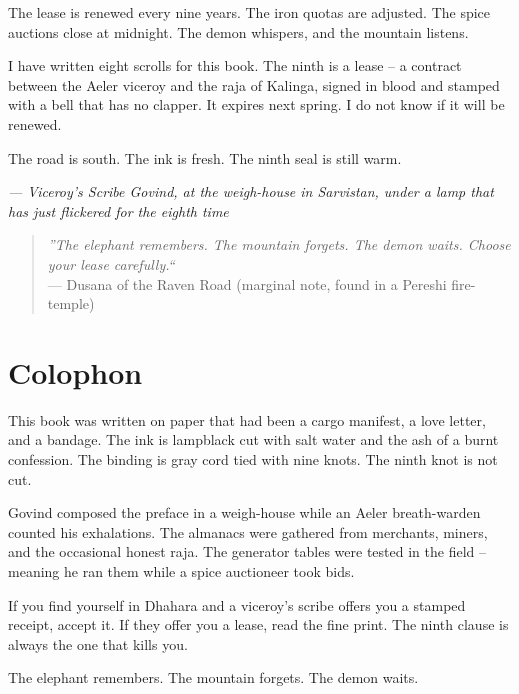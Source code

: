 \documentclass[12pt,oneside]{book}
\begin{document}
The lease is renewed every nine years. The iron quotas are adjusted. The spice auctions close at midnight. The demon whispers, and the mountain listens.

I have written eight scrolls for this book. The ninth is a lease -- a contract between the Aeler viceroy and the raja of Kalinga, signed in blood and stamped with a bell that has no clapper. It expires next spring. I do not know if it will be renewed.

The road is south. The ink is fresh. The ninth seal is still warm.

\vspace{1em}
\noindent\textit{--- Viceroy's Scribe Govind, at the weigh-house in Sarvistan, under a lamp that has just flickered for the eighth time}

\vspace{2em}
\begin{quote}
  \small
  \textit{''The elephant remembers. The mountain forgets. The demon waits. Choose your lease carefully.``} \\
  --- Dusana of the Raven Road (marginal note, found in a Pereshi fire-temple)
\end{quote}

\chapter*{Colophon}

This book was written on paper that had been a cargo manifest, a love letter, and a bandage. The ink is lampblack cut with salt water and the ash of a burnt confession. The binding is gray cord tied with nine knots. The ninth knot is not cut.

Govind composed the preface in a weigh-house while an Aeler breath-warden counted his exhalations. The almanacs were gathered from merchants, miners, and the occasional honest raja. The generator tables were tested in the field -- meaning he ran them while a spice auctioneer took bids.

If you find yourself in Dhahara and a viceroy's scribe offers you a stamped receipt, accept it. If they offer you a lease, read the fine print. The ninth clause is always the one that kills you.

The elephant remembers. The mountain forgets. The demon waits.
\end{document}
